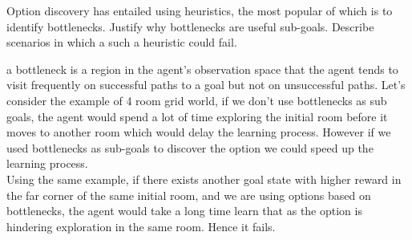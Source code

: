 \documentclass[solution,addpoints,12pt]{exam}
\begin{document}
\begin{questions}
\question[3] Option discovery has entailed using heuristics, the most popular of which is to identify bottlenecks. Justify why bottlenecks are useful sub-goals. Describe scenarios in which a such a heuristic could fail.
\begin{solution}
a bottleneck is a region in the agent’s observation space that the agent tends to visit frequently on successful paths to a goal but not on unsuccessful paths. Let's consider the example of 4 room grid world, if we don't use bottlenecks as sub goals, the agent would spend a lot of time exploring the initial room before it moves to another room which would delay the learning process. However if we used bottlenecks as sub-goals to discover the option we could speed up the learning process. \\
Using the same example, if there exists another goal state with higher reward in the far corner of the same initial room, and we are using options based on bottlenecks, the agent would take a long time learn that as the option is hindering exploration in the same room. Hence it fails.
\end{solution}

\end{questions}
\end{document}
